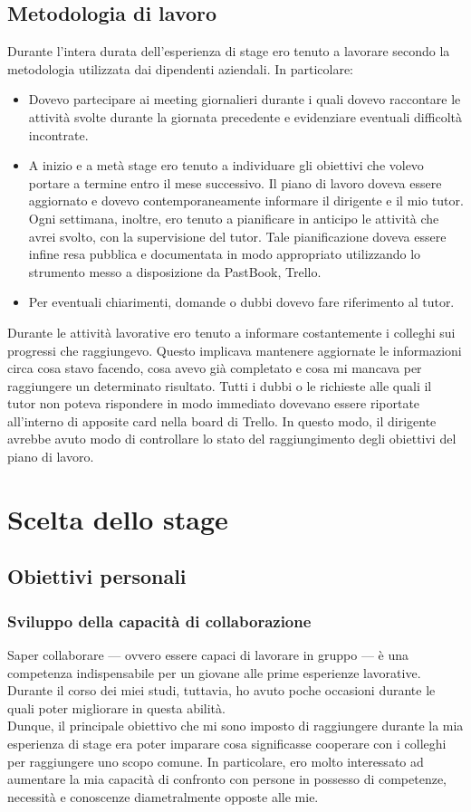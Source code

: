 		\subsection{Metodologia di lavoro}
			Durante l'intera durata dell'esperienza di stage ero tenuto a lavorare secondo la metodologia utilizzata dai dipendenti
			aziendali. In particolare:
			\begin{itemize}
				\item Dovevo partecipare ai meeting giornalieri durante i quali dovevo raccontare le attività svolte durante la
				giornata precedente e evidenziare eventuali difficoltà incontrate.
				\item A inizio e a metà stage ero tenuto a individuare gli obiettivi che volevo portare a termine entro il
				mese successivo. Il piano di lavoro doveva essere aggiornato e dovevo contemporaneamente informare il dirigente e il
				mio tutor. Ogni settimana, inoltre, ero tenuto a pianificare in anticipo le attività che avrei svolto, con la
				supervisione del tutor. Tale pianificazione doveva essere infine resa pubblica e documentata in modo appropriato
				utilizzando lo strumento messo a disposizione da PastBook, Trello.
				\item Per eventuali chiarimenti, domande o dubbi dovevo fare riferimento al tutor.
			\end{itemize}
			Durante le attività lavorative ero tenuto a informare costantemente i colleghi sui progressi che raggiungevo. Questo
			implicava mantenere aggiornate le informazioni circa cosa stavo facendo, cosa avevo già completato e cosa mi mancava
			per raggiungere un determinato risultato. Tutti i dubbi o le richieste alle quali il tutor non poteva rispondere in modo
			immediato dovevano essere riportate all'interno di apposite card nella board di Trello. In questo modo, il dirigente avrebbe
			avuto modo di controllare lo stato del raggiungimento degli obiettivi del piano di lavoro.
	\section{Scelta dello stage}
		\subsection{Obiettivi personali}
			\subsubsection{Sviluppo della capacità di collaborazione}
				Saper collaborare — ovvero essere capaci di lavorare in gruppo — è una competenza indispensabile per un giovane alle
				prime esperienze lavorative. Durante il corso dei miei studi, tuttavia, ho avuto poche occasioni durante le quali
				poter migliorare in questa abilità.\\
				Dunque, il principale obiettivo che mi sono imposto di raggiungere durante la mia esperienza di stage era
				poter imparare cosa significasse cooperare con i colleghi per raggiungere uno scopo comune. In particolare, ero molto
				interessato ad aumentare la mia capacità di confronto con persone in possesso di competenze, necessità e conoscenze
				diametralmente opposte alle mie.
